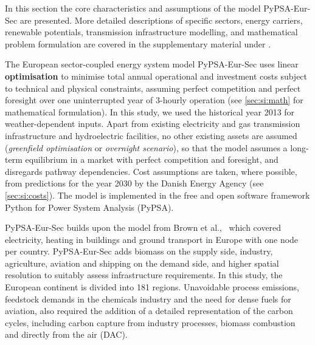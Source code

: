 In this section the core characteristics and assumptions of the model
PyPSA-Eur-Sec are presented. More detailed descriptions of specific sectors,
energy carriers, renewable potentials, transmission infrastructure modelling,
and mathematical problem formulation are covered in the supplementary material
under .

The European sector-coupled energy system model PyPSA-Eur-Sec uses linear
\textbf{optimisation} to minimise total annual operational and investment costs
subject to technical and physical constraints, assuming perfect competition and
perfect foresight over one uninterrupted year of 3-hourly operation (see
\cref{sec:si:math} for mathematical formulation). In this study, we used the
historical year 2013 for weather-dependent inputs. Apart from existing
electricity and gas transmission infrastructure and hydroelectric facilities, no
other existing assets are assumed (\textit{greenfield optimisation} or
\textit{overnight scenario}), so that the model assumes a long-term equilibrium
in a market with perfect competition and foresight, and disregards pathway
dependencies. Cost assumptions are taken, where possible, from predictions for
the year 2030 by the Danish Energy Agency (see
\cref{sec:si:costs}).\cite{DEA} The model is implemented in the free and open software
framework Python for Power System Analysis (PyPSA).\cite{brownPyPSAPython2018}

PyPSA-Eur-Sec builds upon the model from Brown et
al.,~\cite{brownSynergiesSector2018} which covered electricity, heating in
buildings and ground transport in Europe with one node per country.
PyPSA-Eur-Sec adds biomass on the supply side, industry, agriculture, aviation
and shipping on the demand side, and higher spatial resolution to suitably
assess infrastructure requirements. In this study, the European continent is
divided into 181 regions. Unavoidable process emissions, feedstock demands in
the chemicals industry and the need for dense fuels for aviation, also required
the addition of a detailed representation of the carbon cycles, including carbon
capture from industry processes, biomass combustion and directly from the air
(DAC).

